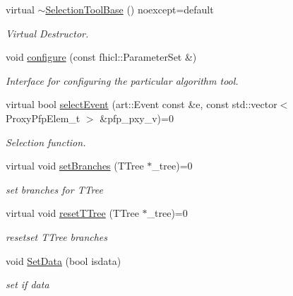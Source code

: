 \begin{DoxyCompactItemize}
\item 
\hypertarget{classselection_1_1SelectionToolBase_a79885af9ff5ab77d239d8484c22ac87e}{virtual \hyperlink{classselection_1_1SelectionToolBase_a79885af9ff5ab77d239d8484c22ac87e}{$\sim$\-Selection\-Tool\-Base} () noexcept=default}\label{classselection_1_1SelectionToolBase_a79885af9ff5ab77d239d8484c22ac87e}

\begin{DoxyCompactList}\small\item\em Virtual Destructor. \end{DoxyCompactList}\item 
void \hyperlink{classselection_1_1SelectionToolBase_a36b68431bd5d3f815619d989faa7ef02}{configure} (const fhicl\-::\-Parameter\-Set \&)
\begin{DoxyCompactList}\small\item\em Interface for configuring the particular algorithm tool. \end{DoxyCompactList}\item 
virtual bool \hyperlink{classselection_1_1SelectionToolBase_ab63818dac49b43418fe9eb3b8cd98c9c}{select\-Event} (art\-::\-Event const \&e, const std\-::vector$<$ Proxy\-Pfp\-Elem\-\_\-t $>$ \&pfp\-\_\-pxy\-\_\-v)=0
\begin{DoxyCompactList}\small\item\em Selection function. \end{DoxyCompactList}\item 
\hypertarget{classselection_1_1SelectionToolBase_aa97ea5e55391240d8e251dae13897996}{virtual void \hyperlink{classselection_1_1SelectionToolBase_aa97ea5e55391240d8e251dae13897996}{set\-Branches} (T\-Tree $\ast$\-\_\-tree)=0}\label{classselection_1_1SelectionToolBase_aa97ea5e55391240d8e251dae13897996}

\begin{DoxyCompactList}\small\item\em set branches for T\-Tree \end{DoxyCompactList}\item 
\hypertarget{classselection_1_1SelectionToolBase_ae51d9c23ceee13bebf196d6535d5f1a5}{virtual void \hyperlink{classselection_1_1SelectionToolBase_ae51d9c23ceee13bebf196d6535d5f1a5}{reset\-T\-Tree} (T\-Tree $\ast$\-\_\-tree)=0}\label{classselection_1_1SelectionToolBase_ae51d9c23ceee13bebf196d6535d5f1a5}

\begin{DoxyCompactList}\small\item\em resetset T\-Tree branches \end{DoxyCompactList}\item 
\hypertarget{classselection_1_1SelectionToolBase_a92ab2f99d650c4a2628cd042a7d09711}{void \hyperlink{classselection_1_1SelectionToolBase_a92ab2f99d650c4a2628cd042a7d09711}{Set\-Data} (bool isdata)}\label{classselection_1_1SelectionToolBase_a92ab2f99d650c4a2628cd042a7d09711}

\begin{DoxyCompactList}\small\item\em set if data \end{DoxyCompactList}\end{DoxyCompactItemize}
